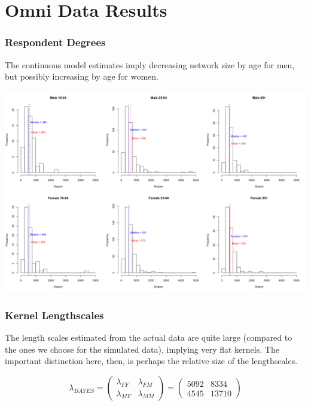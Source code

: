 \documentclass[12pt]{article}
\begin{document}
\pagebreak
\section{Omni Data Results}
\subsubsection*{Respondent Degrees}
The continuous model estimates imply decreasing network size by age for men, but possibly increasing by age for women.

\begin{center}
\includegraphics[scale = 0.33]{Estimates_Degree_Omni.png}
\end{center}

\subsubsection*{Kernel Lengthscales}
\noindent The length scales estimated from the actual data are quite large (compared to the ones we choose for the simulated data), implying very flat kernels. The important distinction here, then, is perhaps the relative size of the lengthscales.

$$ \lambda_{BAYES}
= \left( \begin{array}{cc} \lambda_{FF} & \lambda_{FM} \\
\lambda_{MF} & \lambda_{MM} \end{array} \right) 
= \left( \begin{array}{cc}
5092 & 8334 \\
4545 & 13710 \end{array} \right) $$ \vspace{7 pt}
\end{document}
